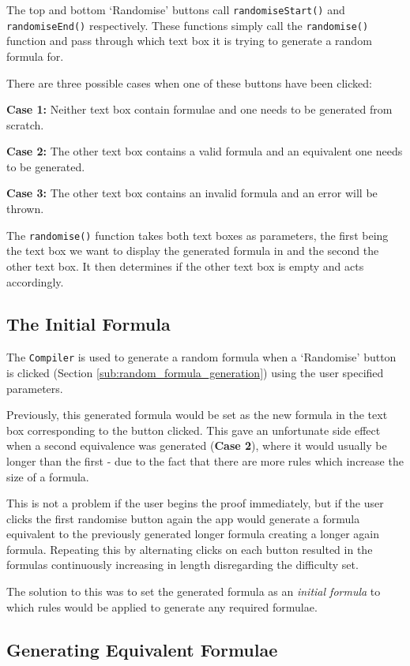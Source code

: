 \documentclass{report}
\begin{document}
The top and bottom `Randomise' buttons call {\tt randomiseStart()} and {\tt randomiseEnd()} respectively. These functions simply call the {\tt randomise()} function and pass through which text box it is trying to generate a random formula for.

There are three possible cases when one of these buttons have been clicked:

\textbf{Case 1:} Neither text box contain formulae and one needs to be generated from scratch.

\textbf{Case 2:} The other text box contains a valid formula and an equivalent one needs to be generated.

\textbf{Case 3:} The other text box contains an invalid formula and an error will be thrown.

The {\tt randomise()} function takes both text boxes as parameters, the first being the text box we want to display the generated formula in and the second the other text box. It then determines if the other text box is empty and acts accordingly.

\subsection{The Initial Formula}

The {\tt Compiler} is used to generate a random formula when a `Randomise' button is clicked (Section \ref{sub:random_formula_generation}) using the user specified parameters.

Previously, this generated formula would be set as the new formula in the text box corresponding to the button clicked. This gave an unfortunate side effect when a second equivalence was generated (\textbf{Case 2}), where it would usually be longer than the first - due to the fact that there are more rules which increase the size of a formula. 

This is not a problem if the user begins the proof immediately, but if the user clicks the first randomise button again the app would generate a formula equivalent to the previously generated longer formula creating a longer again formula. Repeating this by alternating clicks on each button resulted in the formulas continuously increasing in length disregarding the difficulty set.

The solution to this was to set the generated formula as an \textit{initial formula} to which rules would be applied to generate any required formulae.

\subsection{Generating Equivalent Formulae}
\end{document}
